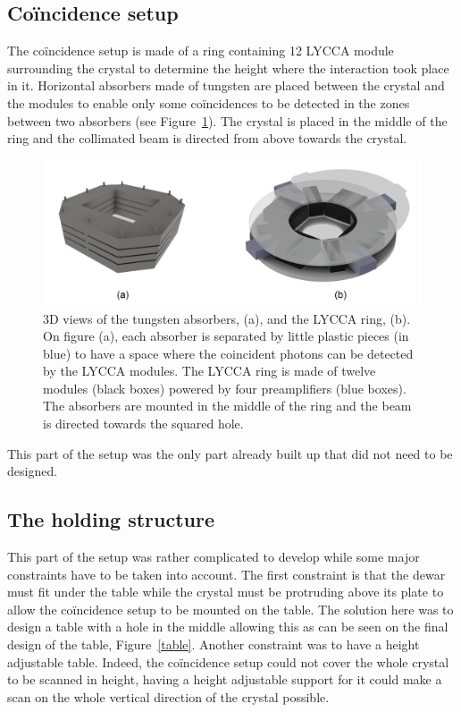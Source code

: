 \documentclass[11pt,a4paper]{article}
\begin{document}
\subsection{Coïncidence setup} \label{coin_setup}

The coïncidence setup is made of a ring containing 12 LYCCA module \cite{LYCCA} surrounding the crystal to determine the height where the interaction took place in it. Horizontal absorbers made of tungsten are placed between the crystal and the modules to enable only some coïncidences to be detected in the zones between two absorbers (see Figure~\ref{coïncidence}). The crystal is placed in the middle of the ring and the collimated beam is directed from above towards the crystal.

\begin{figure}[!h]
\centering
\includegraphics[scale=0.3]{coincidence.png}
\caption{3D views of the tungsten absorbers, (a), and the LYCCA ring, (b). On figure (a), each absorber is separated by little plastic pieces (in blue) to have a space where the coincident photons can be detected by the LYCCA modules. The LYCCA ring is made of twelve modules (black boxes) powered by four preamplifiers (blue boxes). The absorbers are mounted in the middle of the ring and the beam is directed towards the squared hole.}
\label{coïncidence}
\end{figure}

This part of the setup was the only part already built up that did not need to be designed.

\subsection{The holding structure}

This part of the setup was rather complicated to develop while some major constraints have to be taken into account. The first constraint is that the dewar must fit under the table while the crystal must be protruding above its plate to allow the coïncidence setup to be mounted on the table. The solution here was to design a table with a hole in the middle allowing this as can be seen on the final design of the table, Figure~\ref{table}. Another constraint was to have a height adjustable table. Indeed, the coïncidence setup could not cover the whole crystal to be scanned in height, having a height adjustable support for it could make a scan on the whole vertical direction of the crystal possible.
\end{document}
